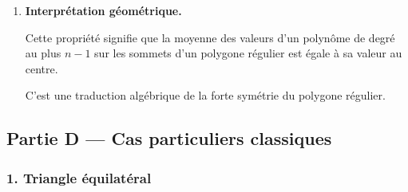 \documentclass[11pt,a4paper]{article}
\newcommand{\U}{\mathbb{U}}
\newcommand{\ii}{\mathrm{i}}
\newcommand{\e}{\mathrm{e}}
\begin{document}
\begin{enumerate}[label=\textbf{C.\arabic*.}]
    Or
    \[
    z_k=a+\lambda\e^{2k\ii\pi/n},
    \]
    donc
    \[
    P(z_k)=Q\!\left(\e^{2k\ii\pi/n}\right).
    \]
    Par conséquent,
    \[
    \sum_{k=0}^{n-1}P(z_k)=\sum_{\omega\in\U_n}Q(\omega).
    \]
    En appliquant A.6 au polynôme \(Q\), on obtient
    \[
    \frac1n\sum_{\omega\in\U_n}Q(\omega)=Q(0).
    \]
    Donc
    \[
    \frac1n\sum_{k=0}^{n-1}P(z_k)=Q(0)=P(a+\lambda\cdot 0)=P(a).
    \]
    Finalement,
    \[
    \boxed{\frac1n\sum_{k=0}^{n-1}P(z_k)=P(a).}
    \]

    \item \textbf{Interprétation géométrique.}

    Cette propriété signifie que la moyenne des valeurs d’un polynôme de degré au plus \(n-1\) sur les sommets d’un polygone régulier est égale à sa valeur au centre.

    C’est une traduction algébrique de la forte symétrie du polygone régulier.

\end{enumerate}

\subsection*{Partie D --- Cas particuliers classiques}

\subsubsection*{1. Triangle équilatéral}
\end{document}
